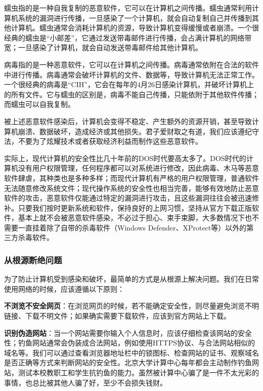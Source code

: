 蠕虫指的是一种自我复制的恶意软件，它可以在计算机之间传播。蠕虫通常利用计算机系统的漏洞进行传播，一旦感染了一个计算机，就会自动复制自己并传播到其他计算机。蠕虫通常会消耗计算机的资源，导致计算机变得缓慢或者崩溃。一个很经典的蠕虫是“小邮差”，它通过发送带毒邮件进行传播，会占满计算机的网络带宽；一旦感染了计算机，就会自动发送带毒邮件给其他计算机。

病毒指的是一种恶意软件，它可以在计算机之间传播。病毒通常依附在合法的软件中进行传播。病毒通常会破坏计算机的文件、数据等，导致计算机无法正常工作。一个很经典的病毒是“CIH”，它会在每年的4月26日感染计算机，并破坏计算机上的所有文件。它与蠕虫的区别是，病毒不能自己传播，只能依附于其他软件传播；而蠕虫可以自我复制。

被上述恶意软件感染后，计算机会变得不稳定、产生额外的资源开销，甚至导致计算机崩溃、数据破坏，造成经济或其他损失。君子爱财取之有道，我们应该遵纪守法，不要为了炫耀技术或者获取经济利益而制作这些恶意软件。

\begin{tip}
  实际上，现代计算机的安全性比几十年前的DOS时代要高太多了。DOS时代的计算机没有用户权限管理，任何程序都可以对系统进行修改，因此病毒、木马等恶意软件肆虐，其种类也是多种多样；而现代计算机有严格的用户权限管理，普通软件无法随意修改系统文件；现代操作系统的安全性也相当完善，能够有效地防止恶意软件的攻击，恶意软件仅能通过特定的漏洞进行攻击，且这些漏洞往往会被迅速修补。只要我们按时更新系统和软件，保持良好的上网习惯，坚持从官方下载正版软件，基本上就不会被恶意软件感染，不必过于担心、束手束脚，大多数情况下也不需要一直挂着除了自带的杀毒软件（Windows Defender、XProtect等）以外的第三方杀毒软件。
\end{tip}

\subsubsection{从根源断绝问题}

为了防止计算机受到感染和破坏，最简单的方式是从根源上解决问题。我们在日常使用网络的时候，应该遵循以下原则：

\textbf{不浏览不安全网页}：在浏览网页的时候，若不能确定安全性，则尽量避免浏览不明链接、下载不明文件；如果确实需要下载软件，应该到官方网站上下载。

\textbf{识别伪造网站}：当一个网站需要你输入个人信息时，应该仔细检查该网站的安全性；钓鱼网站通常会伪装成合法网站，例如使用HTTPS协议、与合法网站相似的域名等。我们可以通过查看浏览器地址栏中的锁图标、检查网站的证书、观察域名是否正确等方式来判断网站的安全性。北京大学计算中心每年都会主动制作钓鱼网站，测试本校教职工和学生抗钓鱼的能力。虽然被计算中心骗了是一件不太光彩的事情，也总比被其他人骗了好，至少不会损失钱财。

